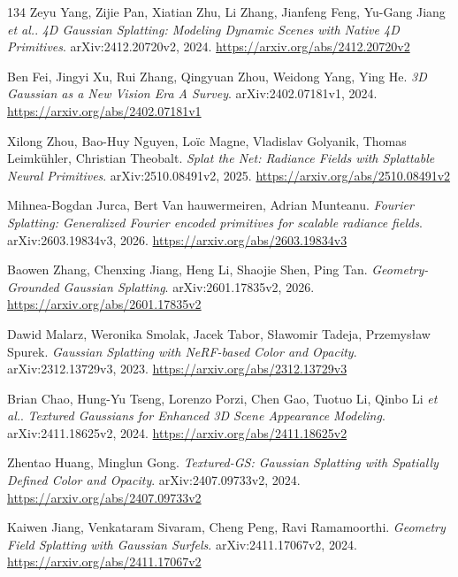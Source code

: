 \documentclass[11pt,a4paper]{article}
\begin{document}
\begin{thebibliography}{134}
Zeyu Yang, Zijie Pan, Xiatian Zhu, Li Zhang, Jianfeng Feng, Yu-Gang Jiang \emph{et al.}.
\newblock \emph{4D Gaussian Splatting: Modeling Dynamic Scenes with Native 4D Primitives}.
\newblock arXiv:2412.20720v2, 2024.
\newblock \url{https://arxiv.org/abs/2412.20720v2}

Ben Fei, Jingyi Xu, Rui Zhang, Qingyuan Zhou, Weidong Yang, Ying He.
\newblock \emph{3D Gaussian as a New Vision Era A Survey}.
\newblock arXiv:2402.07181v1, 2024.
\newblock \url{https://arxiv.org/abs/2402.07181v1}

Xilong Zhou, Bao-Huy Nguyen, Lo\"{i}c Magne, Vladislav Golyanik, Thomas Leimk\"{u}hler, Christian Theobalt.
\newblock \emph{Splat the Net: Radiance Fields with Splattable Neural Primitives}.
\newblock arXiv:2510.08491v2, 2025.
\newblock \url{https://arxiv.org/abs/2510.08491v2}

Mihnea-Bogdan Jurca, Bert Van hauwermeiren, Adrian Munteanu.
\newblock \emph{Fourier Splatting: Generalized Fourier encoded primitives for scalable radiance fields}.
\newblock arXiv:2603.19834v3, 2026.
\newblock \url{https://arxiv.org/abs/2603.19834v3}

Baowen Zhang, Chenxing Jiang, Heng Li, Shaojie Shen, Ping Tan.
\newblock \emph{Geometry-Grounded Gaussian Splatting}.
\newblock arXiv:2601.17835v2, 2026.
\newblock \url{https://arxiv.org/abs/2601.17835v2}

Dawid Malarz, Weronika Smolak, Jacek Tabor, S\l{}awomir Tadeja, Przemys\l{}aw Spurek.
\newblock \emph{Gaussian Splatting with NeRF-based Color and Opacity}.
\newblock arXiv:2312.13729v3, 2023.
\newblock \url{https://arxiv.org/abs/2312.13729v3}

Brian Chao, Hung-Yu Tseng, Lorenzo Porzi, Chen Gao, Tuotuo Li, Qinbo Li \emph{et al.}.
\newblock \emph{Textured Gaussians for Enhanced 3D Scene Appearance Modeling}.
\newblock arXiv:2411.18625v2, 2024.
\newblock \url{https://arxiv.org/abs/2411.18625v2}

Zhentao Huang, Minglun Gong.
\newblock \emph{Textured-GS: Gaussian Splatting with Spatially Defined Color and Opacity}.
\newblock arXiv:2407.09733v2, 2024.
\newblock \url{https://arxiv.org/abs/2407.09733v2}

Kaiwen Jiang, Venkataram Sivaram, Cheng Peng, Ravi Ramamoorthi.
\newblock \emph{Geometry Field Splatting with Gaussian Surfels}.
\newblock arXiv:2411.17067v2, 2024.
\newblock \url{https://arxiv.org/abs/2411.17067v2}


\end{thebibliography}
\end{document}
